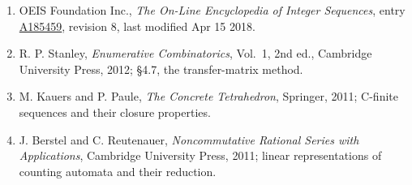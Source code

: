 \documentclass[11pt]{article}
\theoremstyle{definition}
\begin{document}
\begin{enumerate}

\item OEIS Foundation Inc., \emph{The On-Line Encyclopedia of Integer Sequences}, entry \href{https://oeis.org/A185459}{A185459}, revision 8, last modified Apr 15 2018.

\item R. P. Stanley, \emph{Enumerative Combinatorics}, Vol.~1, 2nd ed., Cambridge University Press, 2012; \S4.7, the transfer-matrix method.

\item M. Kauers and P. Paule, \emph{The Concrete Tetrahedron}, Springer, 2011; C-finite sequences and their closure properties.

\item J. Berstel and C. Reutenauer, \emph{Noncommutative Rational Series with Applications}, Cambridge University Press, 2011; linear representations of counting automata and their reduction.

\end{enumerate}
\end{document}
